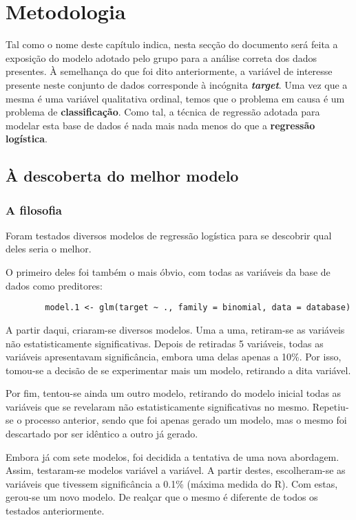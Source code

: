 \documentclass[a4paper]{report}
\begin{document}
\chapter{Metodologia}
\large{
	Tal como o nome deste capítulo indica, nesta secção do documento será feita a exposição do modelo adotado pelo grupo para a análise correta dos dados presentes. À semelhança do que foi dito 
	anteriormente, a variável de interesse presente neste conjunto de dados corresponde à incógnita \textit{\textbf{target}}. Uma vez que a mesma é uma variável qualitativa ordinal, temos que o 
	problema em causa é um problema de \textbf{classificação}. Como tal, a técnica de regressão adotada para modelar esta base de dados é nada mais nada menos do que a \textbf{regressão logística}.

	\section{À descoberta do melhor modelo}
	\subsection{A filosofia}

	Foram testados diversos modelos de regressão logística para se descobrir qual deles seria o melhor.
	
	O primeiro deles foi também o mais óbvio, com todas as variáveis da base de dados como preditores:

	\begin{verbatim}
		model.1 <- glm(target ~ ., family = binomial, data = database)
	\end{verbatim}

	A partir daqui, criaram-se diversos modelos. Uma a uma, retiram-se as variáveis não estatisticamente significativas.
	Depois de retiradas 5 variáveis, todas as variáveis apresentavam significância, embora uma delas apenas a 10\%.
	Por isso, tomou-se a decisão de se experimentar mais um modelo, retirando a dita variável.
	
	Por fim, tentou-se ainda um outro modelo, retirando do modelo inicial todas as variáveis que se revelaram não estatisticamente significativas no mesmo.
	Repetiu-se o processo anterior, sendo que foi apenas gerado um modelo, mas o mesmo foi descartado por ser idêntico a outro já gerado.

	Embora já com sete modelos, foi decidida a tentativa de uma nova abordagem. 
	Assim, testaram-se modelos variável a variável. A partir destes, escolheram-se as variáveis que tivessem significância a 0.1\% (máxima medida do R).
	Com estas, gerou-se um novo modelo. De realçar que o mesmo é diferente de todos os testados anteriormente.

}
\end{document}
